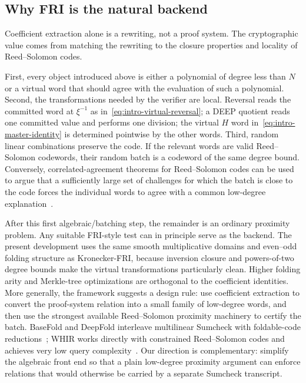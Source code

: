 \subsection{Why FRI is the natural backend}

Coefficient extraction alone is a rewriting, not a proof system.  The cryptographic value comes from matching the rewriting to the closure properties and locality of Reed--Solomon codes.

First, every object introduced above is either a polynomial of degree less than $N$ or a virtual word that should agree with the evaluation of such a polynomial.  Second, the transformations needed by the verifier are local.  Reversal reads the committed word at $\xi^{-1}$ as in~\eqref{eq:intro-virtual-reversal}; a DEEP quotient reads one committed value and performs one division; the virtual $H$ word in~\eqref{eq:intro-master-identity} is determined pointwise by the other words.  Third, random linear combinations preserve the code.  If the relevant words are valid Reed--Solomon codewords, their random batch is a codeword of the same degree bound.  Conversely, correlated-agreement theorems for Reed--Solomon codes can be used to argue that a sufficiently large set of challenges for which the batch is close to the code forces the individual words to agree with a common low-degree explanation~\cite{BSCI23}.

After this first algebraic/batching step, the remainder is an ordinary proximity problem.  Any suitable FRI-style test can in principle serve as the backend.  The present development uses the same smooth multiplicative domains and even--odd folding structure as Kronecker-FRI, because inversion closure and powers-of-two degree bounds make the virtual transformations particularly clean.  Higher folding arity and Merkle-tree optimizations are orthogonal to the coefficient identities.  More generally, the framework suggests a design rule: use coefficient extraction to convert the proof-system relation into a small family of low-degree words, and then use the strongest available Reed--Solomon proximity machinery to certify the batch.  BaseFold and DeepFold interleave multilinear Sumcheck with foldable-code reductions~\cite{BaseFold24,DeepFold25}; WHIR works directly with constrained Reed--Solomon codes and achieves very low query complexity~\cite{WHIR24}.  Our direction is complementary: simplify the algebraic front end so that a plain low-degree proximity argument can enforce relations that would otherwise be carried by a separate Sumcheck transcript.

